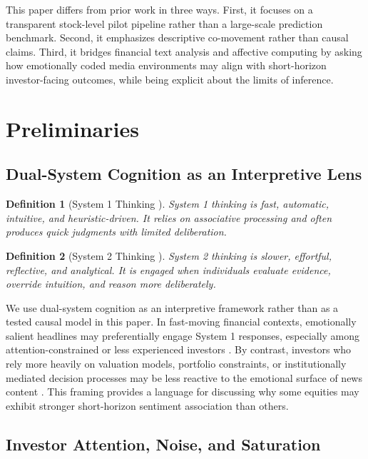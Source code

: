 \documentclass[lettersize,journal]{IEEEtran}
\newtheorem{definition}{Definition}
\begin{document}
This paper differs from prior work in three ways. First, it focuses on a transparent stock-level pilot pipeline rather than a large-scale prediction benchmark. Second, it emphasizes descriptive co-movement rather than causal claims. Third, it bridges financial text analysis and affective computing by asking how emotionally coded media environments may align with short-horizon investor-facing outcomes, while being explicit about the limits of inference.

\section{Preliminaries}
\label{sec:preliminaries}

\subsection{Dual-System Cognition as an Interpretive Lens}
\begin{definition}[System 1 Thinking \cite{kahneman2011thinking}]
System 1 thinking is fast, automatic, intuitive, and heuristic-driven. It relies on associative processing and often produces quick judgments with limited deliberation.
\end{definition}

\begin{definition}[System 2 Thinking \cite{kahneman2011thinking}]
System 2 thinking is slower, effortful, reflective, and analytical. It is engaged when individuals evaluate evidence, override intuition, and reason more deliberately.
\end{definition}

We use dual-system cognition as an interpretive framework rather than as a tested causal model in this paper. In fast-moving financial contexts, emotionally salient headlines may preferentially engage System 1 responses, especially among attention-constrained or less experienced investors \cite{kahneman2011thinking, barber2008all}. By contrast, investors who rely more heavily on valuation models, portfolio constraints, or institutionally mediated decision processes may be less reactive to the emotional surface of news content \cite{campbell1997econometrics}. This framing provides a language for discussing why some equities may exhibit stronger short-horizon sentiment association than others.

\subsection{Investor Attention, Noise, and Saturation}
\end{document}
